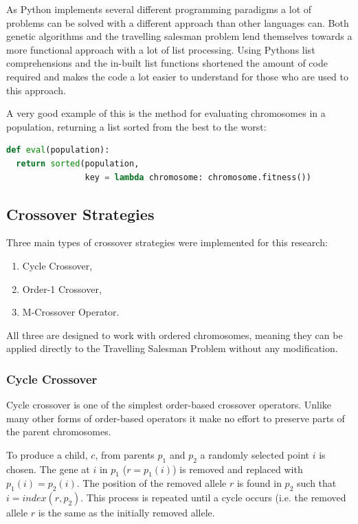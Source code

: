 \documentclass[10pt, a4paper]{article}
\begin{document}
As Python implements several different programming paradigms a lot of problems
can be solved with a different approach than other languages can. Both genetic
algorithms and the travelling salesman problem lend themselves towards a more
functional approach with a lot of list processing. Using Pythons list
comprehensions and the in-built list functions shortened the amount of code 
required and makes the code a lot easier to understand for those who are used 
to this approach.

A very good example of this is the method for evaluating chromosomes in a
population, returning a list sorted from the best to the worst:

\begin{lstlisting}[language=Python, 
                   caption=Using function elements to improve sustinctness and
                           readability]
def eval(population):
  return sorted(population, 
                key = lambda chromosome: chromosome.fitness())
\end{lstlisting}


\subsection{Crossover Strategies}

Three main types of crossover strategies were implemented for this research:

\begin{enumerate}
\item Cycle Crossover,
\item Order-1 Crossover,
\item M-Crossover Operator.%
\end{enumerate}

All three are designed to work with ordered chromosomes, meaning they can be
applied directly to the Travelling Salesman Problem without any modification.

\subsubsection{Cycle Crossover}

Cycle crossover is one of the simplest order-based crossover operators. Unlike
many other forms of order-based operators it make no effort to preserve parts 
of the parent chromosomes.

To produce a child, $c$, from parents $p_1$ and $p_2$ a randomly selected point
$i$ is chosen. The gene at $i$ in $p_1$ ($r = p_1(i)$) is removed and replaced 
with $p_1(i) = p_2(i)$. The position of the removed allele $r$ is found in 
$p_2$ such that $i = index(r, p_2)$. This process is repeated until a cycle
occurs (i.e. the removed allele $r$ is the same as the initially removed 
allele.
 
\end{document}
